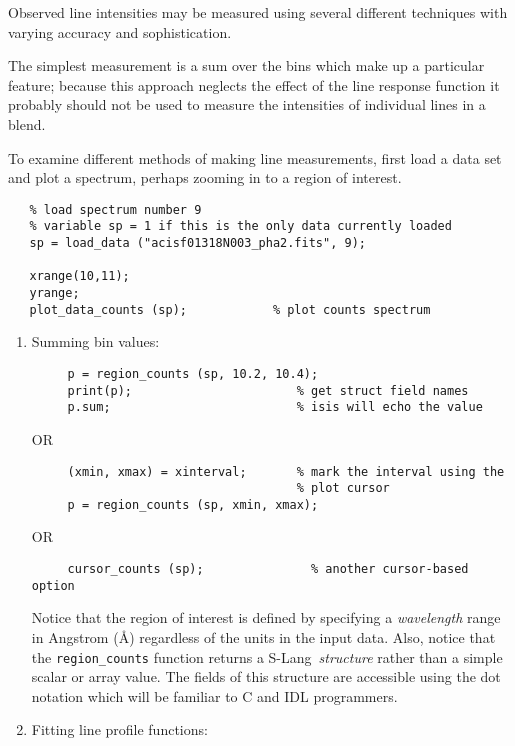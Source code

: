 \documentclass{book}
\newcommand{\slang}{{\sc S-Lang}}
\begin{document}
{Observed line intensities may be measured using several different
techniques with varying accuracy and sophistication.

The simplest measurement is a sum over the bins which make up a particular
feature; because this approach neglects the effect of the line response
function it probably should not be used to measure the intensities of
individual lines in a blend.

To examine different methods of making line measurements, first load
a data set and plot a spectrum, perhaps zooming in to a region of interest.

 \begin{verbatim}
   % load spectrum number 9
   % variable sp = 1 if this is the only data currently loaded
   sp = load_data ("acisf01318N003_pha2.fits", 9);

   xrange(10,11);
   yrange;
   plot_data_counts (sp);            % plot counts spectrum
 \end{verbatim}

  \begin{enumerate}
  \item Summing bin values:

     \begin{verbatim}
     p = region_counts (sp, 10.2, 10.4);
     print(p);                       % get struct field names
     p.sum;                          % isis will echo the value
     \end{verbatim}
     OR
     \begin{verbatim}
     (xmin, xmax) = xinterval;       % mark the interval using the
                                     % plot cursor
     p = region_counts (sp, xmin, xmax);
     \end{verbatim}
     OR
     \begin{verbatim}
     cursor_counts (sp);               % another cursor-based option
     \end{verbatim}

Notice that the region of interest is defined by specifying a {\it
wavelength} range in Angstrom (\AA) regardless of the units in the input
data. Also, notice that the {\tt region\_counts} function returns a \slang\
{\it structure} rather than a simple scalar or array value.  The fields of
this structure are accessible using the dot notation which will be familiar
to C and IDL programmers.

  \item Fitting line profile functions:


\end{enumerate}}
\end{document}
